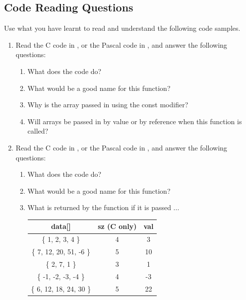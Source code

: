 \clearpage

\subsection{Code Reading Questions} %
\label{sub:code_reading_questions_array}

Use what you have learnt to read and understand the following code samples.
\begin{enumerate}
  \item Read the C code in , or the Pascal code in , and answer the following questions:
  \begin{enumerate}
    \item What does the code do?
    \item What would be a good name for this function?
    \item Why is the array passed in using the const modifier?
    \item Will arrays be passed in by value or by reference when this function is called?
  \end{enumerate}
  \begin{figure}[h]
  \end{figure}
  \begin{figure}[h]
  \end{figure}
  
  \clearpage
  \item Read the C code in , or the Pascal code in , and answer the following questions:
  \begin{enumerate}
    \item What does the code do?
    \item What would be a good name for this function?
    \item What is returned by the function if it is passed ... 
    
    \begin{table}[h]
      \centering
      \begin{tabular}{|c|c|c|}
      \hline
       \textbf{data[]} & \textbf{sz} (C only)  & \textbf{val}  \\
       \hline 
       \{ 1, 2, 3, 4 \} & 4 & 3 \\
       \hline
       \{ 7, 12, 20, 51, -6 \} & 5 & 10 \\
       \hline
       \{ 2, 7, 1 \} & 3 & 1 \\
       \hline
       \{ -1, -2, -3, -4 \} & 4 & -3 \\
       \hline
       \{ 6, 12, 18, 24, 30 \} & 5 & 22 \\
       \hline
      \end{tabular}
    \end{table}
    

\end{enumerate}
\end{enumerate}
